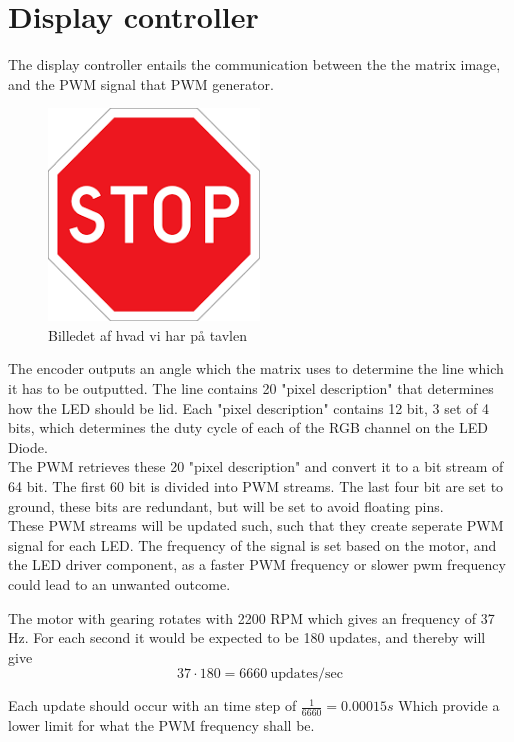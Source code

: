 \section{Display controller}
The display controller entails the communication between the the matrix image, and the PWM signal that PWM generator. 


\begin{figure}[H]
	\center
	\includegraphics[width = 0.5\textwidth]{images/stop}
	\caption{Billedet af hvad vi har på tavlen}
	\label{fig:Image_controller_setup}
\end{figure}

The encoder outputs an angle which the matrix uses to determine the line which it has to be outputted.  The line contains 20 "pixel description" that determines how the LED should be lid.  Each "pixel description" contains 12 bit, 3 set of 4 bits, which determines the duty cycle of each of the RGB channel on the LED Diode.  \\

The PWM retrieves these 20 "pixel description" and convert it to a bit stream of 64 bit.  
The first 60 bit is divided into PWM streams. The last four bit are set to ground,  these bits are redundant, but will be set to avoid floating pins. \\

These PWM streams will be updated such, such that they create seperate PWM signal for each LED.  The frequency of the signal is set based on the motor, and the LED driver component, as a faster PWM frequency or slower pwm frequency could lead to an unwanted outcome. 

The motor with gearing rotates with 2200 RPM which gives an frequency of 37 Hz.	
For each second it would be expected to be 180 updates, and thereby will give 
$$37 \cdot 180 = 6660 ~\text{updates/sec}$$

Each update should occur with an time step of $\frac{1}{6660} = 0.00015s$ Which provide a lower limit for what the PWM frequency shall be.  \\

